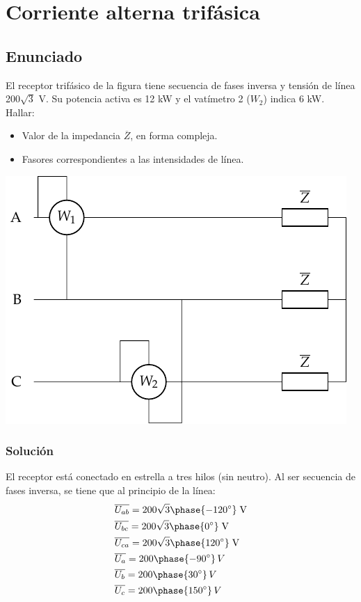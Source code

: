 \chapter{Corriente alterna trifásica}
\section{Enunciado}
 
El receptor trifásico de la figura tiene secuencia de fases inversa y tensión de línea 200$\sqrt{3}$ V. Su potencia activa es 12 kW y el vatímetro 2 ($W_2$) indica 6 kW. Hallar:
\begin{itemize}
    \item Valor de la impedancia $\overline{Z}$, en forma compleja.
    \item Fasores correspondientes a las intensidades de línea.
\end{itemize}

\begin{center}
  \includegraphics[width=0.45\linewidth]{figuras/ej6_BT3.pdf}
\end{center}

\subsection*{Solución}

El receptor está conectado en estrella a tres hilos (sin neutro). Al ser secuencia de fases inversa, se tiene que al principio de la línea:
\begin{align*}
    &\overline{U_{ab}}=200\sqrt{3}\phase{-120^\circ}\;\text{V} \\
    &\overline{U_{bc}}=200\sqrt{3}\phase{0^\circ}\;\text{V} \\
    &\overline{U_{ca}}=200\sqrt{3}\phase{120^\circ}\;\text{V}  \\
    &\overline{U_a}=200\phase{-90^\circ}\,V\\
    &\overline{U_b}=200\phase{30^\circ}\,V\\
    &\overline{U_c}=200\phase{150^\circ}\,V
\end{align*}

